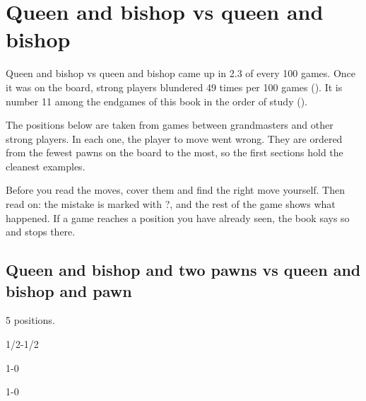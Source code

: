 \chapter{Queen and bishop vs queen and bishop}\label{ch:queen-and-bishop-vs-queen-and-bishop}
Queen and bishop vs queen and bishop came up in 2.3 of every 100 games. Once it was on the board, strong players blundered 49 times per 100 games (). It is number 11 among the endgames of this book in the order of study ().

The positions below are taken from games between grandmasters and other strong players. In each one, the player to move went wrong. They are ordered from the fewest pawns on the board to the most, so the first sections hold the cleanest examples.

Before you read the moves, cover them and find the right move yourself. Then read on: the mistake is marked with ?, and the rest of the game shows what happened. If a game reaches a position you have already seen, the book says so and stops there.


\section{Queen and bishop and two pawns vs queen and bishop and pawn}
5 positions.


1/2-1/2\par
{}

1-0\par
{}

1-0\par
{}

